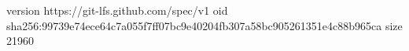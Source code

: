 version https://git-lfs.github.com/spec/v1
oid sha256:99739e74ece64c7a055f7ff07bc9e40204fb307a58bc905261351e4c88b965ca
size 21960
